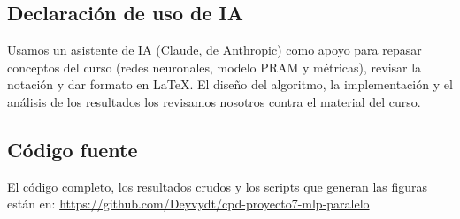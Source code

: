 \documentclass[11pt,a4paper]{article}
\begin{document}
\subsection*{Declaración de uso de IA}
Usamos un asistente de IA (Claude, de Anthropic) como apoyo para repasar conceptos del curso (redes neuronales, modelo PRAM y métricas), revisar la notación y dar formato en \LaTeX. El diseño del algoritmo, la implementación y el análisis de los resultados los revisamos nosotros contra el material del curso.

\subsection*{Código fuente}
El código completo, los resultados crudos y los scripts que generan las figuras están en:
\url{https://github.com/Deyvydt/cpd-proyecto7-mlp-paralelo}
\end{document}

